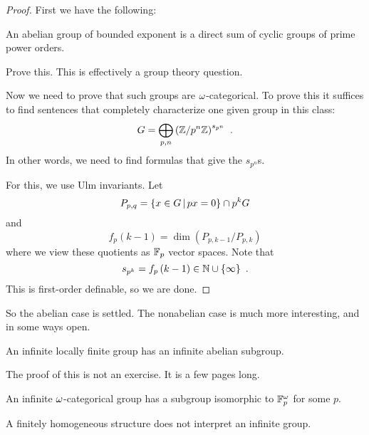 \documentclass{amsart}
\begin{document}
\begin{proof}
First we have the following:
\begin{fact}
An abelian group of bounded exponent is a direct sum of cyclic groups of prime power
orders.
\end{fact}
\begin{exr}
Prove this. This is effectively a group theory question.
\end{exr}

Now we need to prove that such groups are $\omega$-categorical.
To prove this it suffices to find sentences that completely characterize one given group
in this class:
\begin{equation}
G = \bigoplus\limits_{p,n} \left( \mathbb{Z} / p^n \mathbb{Z} \right)^{s_{p^n}} \ .
\end{equation}
In other words, we need to find formulas that give the $s_{p^n}$s.

For this, we use Ulm invariants. Let
\begin{equation}
P_{p,q} = \left\{ x\in G \, \middle\vert \, px = 0 \right\}\cap p^k G
\end{equation}
and
\begin{equation}
f_p\left( k-1 \right) = \dim\left( P_{p,k-1} / P_{p,k} \right)
\end{equation}
where we view these quotients as $\mathbb{F}_p$ vector spaces.
Note that
\begin{equation}
s_{p^k} = f_p\left( k-1 \right) \in \mathbb{N}\cup\left\{ \infty \right\} \ .
\end{equation}
This is first-order definable, so we are done.
\end{proof}

So the abelian case is settled. The nonabelian case is much more interesting, and in some
ways open.

\begin{fact}
An infinite locally finite group has an infinite abelian subgroup.
\end{fact}

\begin{wrn}
The proof of this is not an exercise.
It is a few pages long.
\end{wrn}

\begin{cor}
An infinite $\omega$-categorical group has a subgroup isomorphic to $\mathbb{F}_p^\omega$
for some $p$.
\end{cor}

\begin{thm}[MacPherson]
A finitely homogeneous structure does not interpret an infinite group.
\end{thm}
\end{document}
